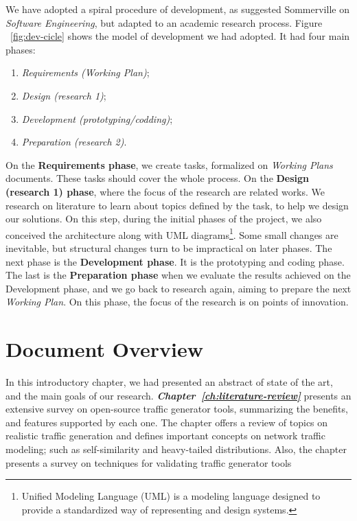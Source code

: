 We have adopted a spiral procedure of development, as suggested Sommerville on \textit{Software Engineering}\cite{sommerville}, but adapted to an academic research process. Figure ~\ref{fig:dev-cicle} shows the model of development we had adopted. It had four main phases: 

\begin{enumerate}
    \item \textit{Requirements (Working Plan)};
    \item \textit{Design (research 1)};
    \item \textit{Development (prototyping/codding)};
    \item \textit{Preparation (research 2)}.
\end{enumerate}

On the \textbf{Requirements phase}, we create tasks,  formalized on \textit{Working Plans} documents.  These tasks should cover the whole process. On the \textbf{Design (research 1) phase}, where the focus of the research are related works. We research on literature to learn about topics defined by the task, to help we design our solutions. On this step, during the initial phases of the project,  we also conceived the architecture along with \acrfull{UML} diagrams\footnote{Unified Modeling Language (UML) is a modeling language designed to provide a standardized way of representing and design systems\cite{uml}.}. Some small changes are inevitable, but structural changes turn to be impractical on later phases. The next phase is the \textbf{Development phase}. It is the prototyping and coding phase.  The last is the \textbf{Preparation phase} when we evaluate the results achieved on the Development phase, and we go back to research again,  aiming to prepare the next \textit{Working Plan}.  On this phase, the focus of the research is on points of innovation.


\section{Document Overview}


In this introductory chapter, we had presented an abstract of state of the art, and the main goals of our research. \textit{\textbf{Chapter~\ref{ch:literature-review}}} presents an extensive survey on open-source traffic generator tools, summarizing the benefits, and features supported by each one. The chapter offers a  review of topics on realistic traffic generation and defines important concepts on network traffic modeling; such as self-similarity and heavy-tailed distributions. Also, the chapter presents a survey on techniques for validating traffic generator tools 

